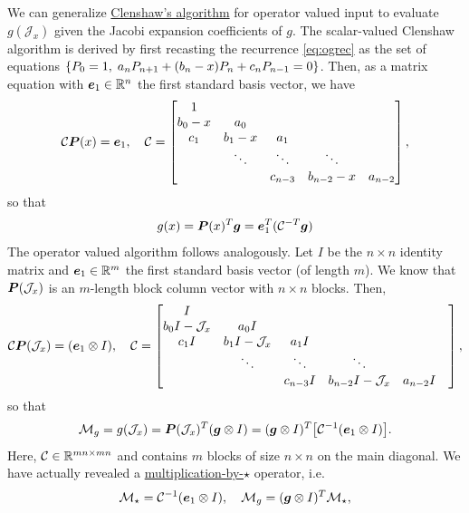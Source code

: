 We can generalize \underline{Clenshaw's algorithm} \cite{Clenshaw} for operator valued input to evaluate $g(\mathcal{J}_x)$ given the Jacobi expansion coefficients of $g$. The scalar-valued Clenshaw algorithm is derived by first recasting the recurrence \eqref{eq:ogrec} as the set of equations $\{P_0 = 1,\; a_n P_{n+1} + (b_n-x)P_n + c_nP_{n-1}= 0\}$. Then, as a matrix equation with $\boldsymbol{e}_1 \in \mathbb{R}^n$ the first standard basis vector, we have
\begin{equation}
\mathcal{C}\boldsymbol{P}(x) = \boldsymbol{e}_1,\quad 
\mathcal{C} = \begin{bmatrix}
	1 & & & &\\
	b_0-x & a_0 & & &\\
	c_1 & b_1-x & a_1 & & \\
	& \ddots & \ddots & \ddots & \\
	& & c_{n-3} & b_{n-2}-x & a_{n-2}
\end{bmatrix},	
\end{equation}
so that 
\begin{equation}
	g(x) = \boldsymbol{P}(x)^T \boldsymbol{g} = \boldsymbol{e}_1^T(\mathcal{C}^{-T}\boldsymbol{g})
\end{equation}
The operator valued algorithm follows analogously. Let $I$ be the $n\times n$ identity matrix and $\boldsymbol{e}_1 \in \mathbb{R}^m$ the first standard basis vector (of length $m$). We know that $\boldsymbol{P}(\mathcal{J}_x)$ is an $m$-length block column vector with $n\times n$ blocks. Then,
\begin{equation}
\mathcal{C}\boldsymbol{P}(\mathcal{J}_x) = (\boldsymbol{e}_1 \otimes I),\quad \mathcal{C} = \begin{bmatrix}
	I & & & &\\
	b_0I-\mathcal{J}_x & a_0I & & &\\
	c_1I & b_1I-\mathcal{J}_x & a_1I & & \\
	& \ddots & \ddots & \ddots & & \\
	& & c_{n-3}I & b_{n-2}I-\mathcal{J}_x & a_{n-2}I
\end{bmatrix},
\end{equation}
so that
\begin{equation}
	\mathcal{M}_g = g(\mathcal{J}_x) = \boldsymbol{P}(\mathcal{J}_x)^T(\boldsymbol{g}\otimes I) = (\boldsymbol{g} \otimes I)^T\big[\mathcal{C}^{-1}(\boldsymbol{e}_1 \otimes I)\big].
\end{equation}
Here, $\mathcal{C} \in \mathbb{R}^{mn\times mn}$ and contains $m$ blocks of size $n\times n$ on the main diagonal. We have actually revealed a \underline{multiplication-by-$\star$} operator, i.e.
\begin{equation}
\mathcal{M}_{\star} = \mathcal{C}^{-1}(\boldsymbol{e}_1\otimes I), \quad \mathcal{M}_g = (\boldsymbol{g} \otimes I)^T \mathcal{M}_\star,
\end{equation}
